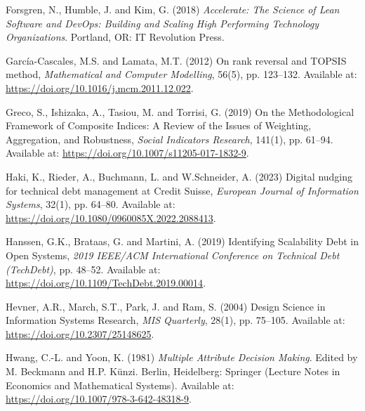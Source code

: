 \documentclass[
  british,
  12pt,
  a4paper,
]{report}
\newlength{\cslhangindent}
\newenvironment{CSLReferences}[2] %
 {\begin{list}{}{%
  \setlength{\itemindent}{0pt}
  \setlength{\leftmargin}{0pt}
  \setlength{\parsep}{0pt}
  \ifodd #1
   \setlength{\leftmargin}{\cslhangindent}
   \setlength{\itemindent}{-1\cslhangindent}
  \fi
  \setlength{\itemsep}{#2\baselineskip}}}
 {\end{list}}
\begin{document}
\begin{CSLReferences}{0}{1}
Forsgren, N., Humble, J. and Kim, G. (2018) \emph{Accelerate: {The
Science} of {Lean Software} and {DevOps}: {Building} and {Scaling High
Performing Technology Organizations}}. Portland, OR: IT Revolution
Press.

García-Cascales, M.S. and Lamata, M.T. (2012) \textquotesingle On rank
reversal and {TOPSIS} method\textquotesingle, \emph{Mathematical and
Computer Modelling}, 56(5), pp. 123--132. Available at:
\url{https://doi.org/10.1016/j.mcm.2011.12.022}.

Greco, S., Ishizaka, A., Tasiou, M. and Torrisi, G. (2019)
\textquotesingle On the {Methodological Framework} of {Composite
Indices}: {A Review} of the {Issues} of {Weighting}, {Aggregation}, and
{Robustness}\textquotesingle, \emph{Social Indicators Research}, 141(1),
pp. 61--94. Available at:
\url{https://doi.org/10.1007/s11205-017-1832-9}.

Haki, K., Rieder, A., Buchmann, L. and W.Schneider, A. (2023)
\textquotesingle Digital nudging for technical debt management at
{Credit Suisse}\textquotesingle, \emph{European Journal of Information
Systems}, 32(1), pp. 64--80. Available at:
\url{https://doi.org/10.1080/0960085X.2022.2088413}.

Hanssen, G.K., Brataas, G. and Martini, A. (2019)
\textquotesingle Identifying {Scalability Debt} in {Open
Systems}\textquotesingle, \emph{2019 {IEEE}/{ACM International
Conference} on {Technical Debt} ({TechDebt})}, pp. 48--52. Available at:
\url{https://doi.org/10.1109/TechDebt.2019.00014}.

Hevner, A.R., March, S.T., Park, J. and Ram, S. (2004)
\textquotesingle Design {Science} in {Information Systems
Research}\textquotesingle, \emph{MIS Quarterly}, 28(1), pp. 75--105.
Available at: \url{https://doi.org/10.2307/25148625}.

Hwang, C.-L. and Yoon, K. (1981) \emph{Multiple {Attribute Decision
Making}}. Edited by M. Beckmann and H.P. Künzi. Berlin, Heidelberg:
Springer (Lecture {Notes} in {Economics} and {Mathematical Systems}).
Available at: \url{https://doi.org/10.1007/978-3-642-48318-9}.


\end{CSLReferences}
\end{document}
